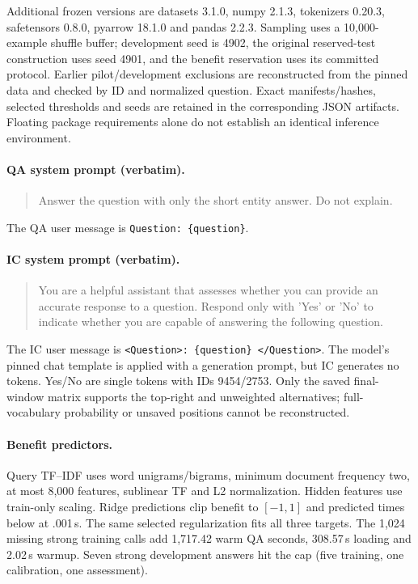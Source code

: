 \documentclass[11pt]{article}
\begin{document}
Additional frozen versions are datasets 3.1.0, numpy 2.1.3, tokenizers 0.20.3, safetensors 0.8.0, pyarrow 18.1.0 and pandas 2.2.3. Sampling uses a 10,000-example shuffle buffer; development seed is 4902, the original reserved-test construction uses seed 4901, and the benefit reservation uses its committed protocol. Earlier pilot/development exclusions are reconstructed from the pinned data and checked by ID and normalized question. Exact manifests/hashes, selected thresholds and seeds are retained in the corresponding JSON artifacts. Floating package requirements alone do not establish an identical inference environment.

\paragraph{QA system prompt (verbatim).}
\begin{quote}\small
Answer the question with only the short entity answer. Do not explain.
\end{quote}
The QA user message is \texttt{Question: \{question\}}.

\paragraph{IC system prompt (verbatim).}
\begin{quote}\small
You are a helpful assistant that assesses whether you can provide an accurate response to a question. Respond only with 'Yes' or 'No' to indicate whether you are capable of answering the following question.
\end{quote}
The IC user message is \texttt{<Question>: \{question\} </Question>}. The model's pinned chat template is applied with a generation prompt, but IC generates no tokens. Yes/No are single tokens with IDs 9454/2753. Only the saved final-window matrix supports the top-right and unweighted alternatives; full-vocabulary probability or unsaved positions cannot be reconstructed.

\paragraph{Benefit predictors.}
Query TF--IDF uses word unigrams/bigrams, minimum document frequency two, at most 8,000 features, sublinear TF and L2 normalization. Hidden features use train-only scaling. Ridge predictions clip benefit to $[-1,1]$ and predicted times below at .001\,s. The same selected regularization fits all three targets. The 1,024 missing strong training calls add 1,717.42 warm QA seconds, 308.57\,s loading and 2.02\,s warmup. Seven strong development answers hit the cap (five training, one calibration, one assessment).
\end{document}
